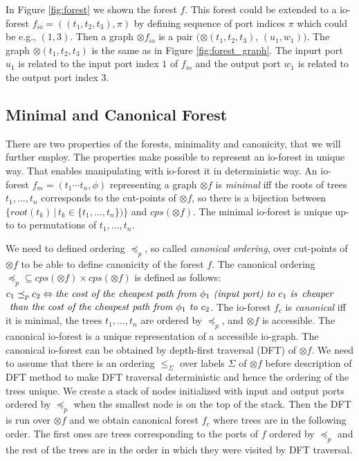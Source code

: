 In Figure \ref{fig:forest} we shown the forest $f$.
This forest could be extended to a io-forest $f_{io}=((t_1,t_2,t_3),\pi)$ by defining sequence of port indices $\pi$
which could be e.g., $(1,3)$.
Then a graph $\otimes f_{io}$ is a pair $(\otimes (t_1,t_2,t_3)$, $(u_1,w_1))$.
The graph $\otimes (t_1,t_2,t_3)$ is the same as in Figure \ref{fig:forest_graph}.
The inpurt port $u_1$ is related to the input port index $1$ of $f_{io}$
and the output port $w_1$ is related to the output port index $3$.
\label{ex:iograph}
\eexmp

\subsection{Minimal and Canonical Forest}
\label{subsec:mcforest}

There are two properties of the forests, minimality and canonicity, that we will further employ.
The properties make possible to represent an io-forest in unique way.
That enables manipulating with io-forest it in deterministic way.
An io-forest $f_m=(t_1 \cdots t_n, \phi)$ representing a graph $\otimes f$ is \emph{minimal}
iff the roots of trees $t_1,\ldots,t_n$ corresponds to the cut-points of $\otimes f$,
so there is a bijection between $\{root(t_k)\,|\, t_k \in \{t_1, \ldots, t_n\} )\}$ and $cps(\otimes f)$.
The minimal io-forest is unique up-to to permutations of $t_1,\ldots,t_n$.

We need to defined ordering $\preceq_p$, so called \emph{canonical ordering}, over cut-points of $\otimes f$ to be able to define canonicity of the forest $f$.
The canonical ordering $\preceq_p \subseteq cps(\otimes f) \times cps(\otimes f)$ is defined as follows: $c_1 \preceq_p c_2 \Leftrightarrow \emph{the cost of the cheapest path from }
\phi_1 \emph{ (input port) to } c_1 \emph{ is}$ $\emph{cheaper}$ $\emph{ than the cost of the cheapest path from } \phi_1 \emph{ to } c_2$.
The io-forest $f_c$ is \emph{canonical} iff it is minimal, the trees $t_1,\ldots, t_n$ are ordered by $\preceq_p$, and $\otimes f$ is accessible.
The canonical io-forest is a unique representation of a accessible io-graph.
The canonical io-forest can be obtained by depth-first traversal (DFT)\cite{taocp} of $\otimes f$.
We need to assume that there is an ordering $\leq_\Sigma$ over labels $\Sigma$ of $\otimes f$ before description of DFT method to
make DFT traversal deterministic and hence the ordering of the trees unique.
We create a stack of nodes initialized with input and output ports ordered by $\preceq_p$ when the smallest node is on the top of the stack.
Then the DFT is run over $\otimes f$ and we obtain canonical forest $f_c$ where trees are in the following order.
The first ones are trees corresponding to the ports of $f$ ordered by $\preceq_p$ and the rest of the trees are in the order
in which they were visited by DFT traversal.


